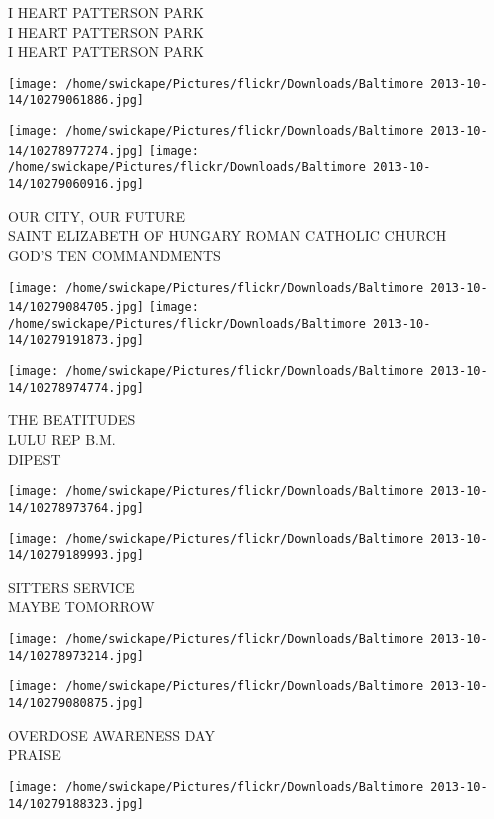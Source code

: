 \documentclass[10pt,letterpaper]{article}
\begin{document}
I HEART PATTERSON PARK\\
I HEART PATTERSON PARK\\
I HEART PATTERSON PARK
\pagebreak

\texttt{[image: /home/swickape/Pictures/flickr/Downloads/Baltimore 2013-10-14/10279061886.jpg]}

\vspace{0.25in}
\texttt{[image: /home/swickape/Pictures/flickr/Downloads/Baltimore 2013-10-14/10278977274.jpg]}
\texttt{[image: /home/swickape/Pictures/flickr/Downloads/Baltimore 2013-10-14/10279060916.jpg]}

OUR CITY, OUR FUTURE\\
SAINT ELIZABETH OF HUNGARY ROMAN CATHOLIC CHURCH\\
GOD'S TEN COMMANDMENTS
\pagebreak

\texttt{[image: /home/swickape/Pictures/flickr/Downloads/Baltimore 2013-10-14/10279084705.jpg]}
\texttt{[image: /home/swickape/Pictures/flickr/Downloads/Baltimore 2013-10-14/10279191873.jpg]}

\vspace{0.25in}
\texttt{[image: /home/swickape/Pictures/flickr/Downloads/Baltimore 2013-10-14/10278974774.jpg]}

THE BEATITUDES\\
LULU REP B.M.\\
DIPEST
\pagebreak

\texttt{[image: /home/swickape/Pictures/flickr/Downloads/Baltimore 2013-10-14/10278973764.jpg]}

\vspace{0.25in}
\texttt{[image: /home/swickape/Pictures/flickr/Downloads/Baltimore 2013-10-14/10279189993.jpg]}

SITTERS SERVICE\\
MAYBE TOMORROW
\pagebreak

\texttt{[image: /home/swickape/Pictures/flickr/Downloads/Baltimore 2013-10-14/10278973214.jpg]}

\vspace{0.25in}
\texttt{[image: /home/swickape/Pictures/flickr/Downloads/Baltimore 2013-10-14/10279080875.jpg]}

OVERDOSE AWARENESS DAY\\
PRAISE
\pagebreak

\texttt{[image: /home/swickape/Pictures/flickr/Downloads/Baltimore 2013-10-14/10279188323.jpg]}
\end{document}
